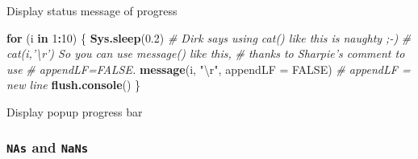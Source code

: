 \documentclass[10,portrait]{article}
\newenvironment{Shaded}{\begin{snugshade}}{\end{snugshade}}
\newcommand{\KeywordTok}[1]{\textcolor[rgb]{0.13,0.29,0.53}{\textbf{#1}}}
\newcommand{\DataTypeTok}[1]{\textcolor[rgb]{0.13,0.29,0.53}{#1}}
\newcommand{\DecValTok}[1]{\textcolor[rgb]{0.00,0.00,0.81}{#1}}
\newcommand{\FloatTok}[1]{\textcolor[rgb]{0.00,0.00,0.81}{#1}}
\newcommand{\CharTok}[1]{\textcolor[rgb]{0.31,0.60,0.02}{#1}}
\newcommand{\StringTok}[1]{\textcolor[rgb]{0.31,0.60,0.02}{#1}}
\newcommand{\CommentTok}[1]{\textcolor[rgb]{0.56,0.35,0.01}{\textit{#1}}}
\newcommand{\OtherTok}[1]{\textcolor[rgb]{0.56,0.35,0.01}{#1}}
\newcommand{\ControlFlowTok}[1]{\textcolor[rgb]{0.13,0.29,0.53}{\textbf{#1}}}
\newcommand{\OperatorTok}[1]{\textcolor[rgb]{0.81,0.36,0.00}{\textbf{#1}}}
\newcommand{\NormalTok}[1]{#1}
\begin{document}
Display status message of progress

\begin{Shaded}
\begin{Highlighting}[]
\ControlFlowTok{for}\NormalTok{ (i }\ControlFlowTok{in} \DecValTok{1}\OperatorTok{:}\DecValTok{10}\NormalTok{) \{}
    \KeywordTok{Sys.sleep}\NormalTok{(}\FloatTok{0.2}\NormalTok{)}
    \CommentTok{# Dirk says using cat() like this is naughty ;-)}
    \CommentTok{# cat(i,'\textbackslash{}r') So you can use message() like this,}
    \CommentTok{# thanks to Sharpie's comment to use}
    \CommentTok{# appendLF=FALSE.}
    \KeywordTok{message}\NormalTok{(i, }\StringTok{"}\CharTok{\textbackslash{}r}\StringTok{"}\NormalTok{, }\DataTypeTok{appendLF =} \OtherTok{FALSE}\NormalTok{)  }\CommentTok{# appendLF = new line }
    \KeywordTok{flush.console}\NormalTok{()}
\NormalTok{\}}
\end{Highlighting}
\end{Shaded}

Display popup progress bar

\begin{Shaded}
\end{Shaded}

\subsubsection{\texorpdfstring{\texttt{NAs} and
\texttt{NaNs}}{NAs and NaNs}}\label{nas-and-nans}
\end{document}
